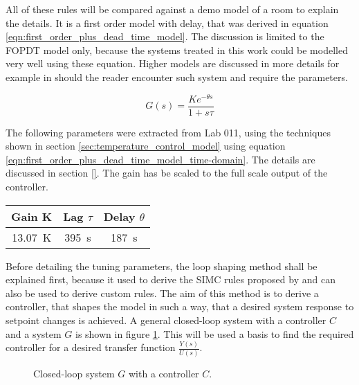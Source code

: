 All of these rules will be compared against a demo model of a room to explain the details. It is a first order model with delay, that was derived in equation \ref{eqn:first_order_plus_dead_time_model}. The discussion is limited to the FOPDT model only, because the systems treated in this work could be modelled very well using these equation. Higher models are discussed in more details for example in \cite{advanced_pid_control,pid_controller} should the reader encounter such system and require the parameters.

\begin{equation}
    G(s) = \frac{K e^{-\theta s}}{1 + s \tau} \label{eqn:demo_process_model}
\end{equation}

The following parameters were extracted from Lab 011, using the techniques shown in section \ref{sec:temperature_control_model} using equation \ref{eqn:first_order_plus_dead_time_model_time-domain}. The details are discussed in section \ref{}. The gain has be scaled to the full scale output of the controller.
\begin{table}[hb]
    \centering
    \begin{tabular}{ccc}
        \toprule
        Gain K& Lag $\tau$& Delay $\theta$ \\
        \midrule
        \qty{13.07}{\K}& \qty{395}{\s}& \qty{187}{\s}\\
        \bottomrule
    \end{tabular}
\end{table}

Before detailing the tuning parameters, the loop shaping method shall be explained first, because it used to derive the SIMC rules proposed by \citeauthor{simc_paper} and can also be used to derive custom rules. The aim of this method is to derive a controller, that shapes the model in such a way, that a desired system response to setpoint changes is achieved. A general closed-loop system with a controller $C$ and a system $G$ is shown in figure \ref{fig:closed_loop_controller}. This will be used a basis to find the required controller for a desired transfer function $\frac{Y(s)}{U(s)}$.
\begin{figure}[ht]
    \centering
    \caption{Closed-loop system $G$ with a controller $C$.}
    \label{fig:closed_loop_controller}
\end{figure}

